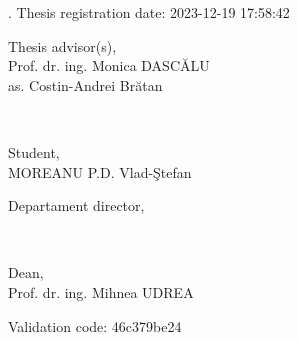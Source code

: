 {\vfill{}. Thesis registration date: 2023-12-19 17:58:42

\vfill\noindent
\begin{minipage}[t]{0.49\textwidth}
\flushleft
Thesis advisor(s),\\
Prof. dr. ing. Monica DASCĂLU\\
as. Costin-Andrei Brătan\\
\end{minipage}
~
\begin{minipage}[t]{0.49\textwidth}
\flushright
Student,\\
MOREANU P.D. Vlad-Ştefan
\end{minipage}

\vfill\noindent
\begin{minipage}[t]{0.49\textwidth}
\flushleft
Departament director,
\end{minipage}
~
\begin{minipage}[t]{0.49\textwidth}
\flushright
Dean,\\
Prof. dr. ing. Mihnea UDREA
\end{minipage}


\vfill\noindent
Validation code: 46c379be24
}

